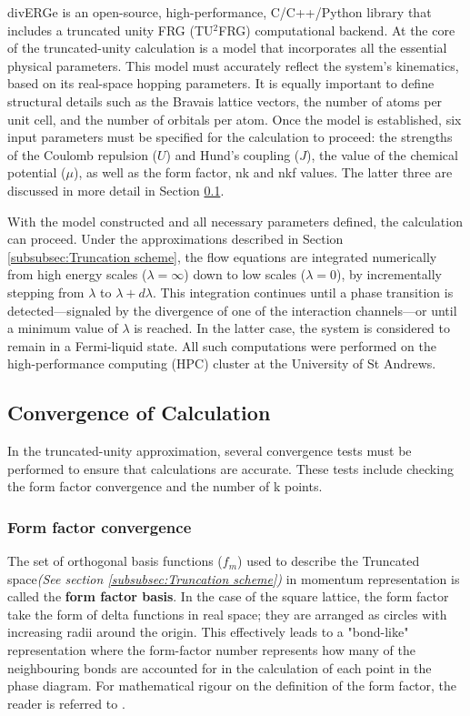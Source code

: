 \documentclass[12pt]{article}
\begin{document}
divERGe is an open-source, high-performance, C/C++/Python library that includes a truncated unity FRG (TU$^2$FRG) computational backend\cite{profe2024diverge}. 
At the core of the truncated-unity calculation is a model that incorporates all the essential physical parameters. This model must accurately reflect the system's kinematics, based on its real-space hopping parameters.
It is equally important to define structural details such as the Bravais lattice vectors, the number of atoms per unit cell, 
and the number of orbitals per atom. Once the model is established, six input parameters must be specified for the calculation to proceed: 
the strengths of the Coulomb repulsion ($U$) and Hund’s coupling ($J$), the value of the chemical potential ($\mu$), as well as the form factor, nk and nkf
values. The latter three are discussed in more detail in Section \ref{subsec:convergence}.\par
\medskip
\noindent With the model constructed and all necessary parameters defined, 
the calculation can proceed. Under the approximations described in Section \ref{subsubsec:Truncation scheme},
the flow equations are integrated numerically from high energy scales ($\lambda = \infty$) down to low scales ($\lambda = 0$), 
by incrementally stepping from $\lambda$ to $\lambda + d\lambda$. This integration continues until a phase transition is detected—signaled 
by the divergence of one of the interaction channels—or until a minimum value of $\lambda$ is reached. In the latter case, the system is considered to remain 
in a Fermi-liquid state. All such computations were performed on the high-performance computing (HPC) cluster at the University of St Andrews.


 

\subsection{Convergence of Calculation}
\label{subsec:convergence}
In the truncated-unity approximation, several convergence tests must be performed to ensure that calculations are accurate.
These tests include checking the form factor convergence and the number of k points.

\subsubsection{Form factor convergence}

The set of orthogonal basis functions ($f_m$) used to describe the Truncated space\textit{(See section \ref{subsubsec:Truncation scheme})}
in momentum representation is called the \textbf{form factor basis}. In the case of the square lattice, 
the form factor take the form of delta functions in real space; they are arranged as circles with increasing radii around the origin. This effectively leads to a "bond-like" representation where the form-factor number
represents how many of the neighbouring bonds are accounted for in the calculation of each point in the phase diagram. For mathematical rigour on the definition of the form factor, the reader is referred to \cite{lichtenstein2018functional}. \par
\end{document}
